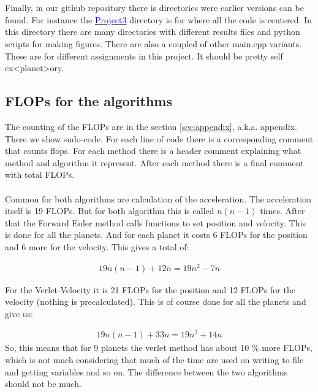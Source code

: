 \\
\\
Finally, in our github repository there is directories were earlier versions can be found. For instance the 
\href{https://github.com/erikfsk/Project-3/tree/master/Project3/}{\textcolor{blue}{Project3}} directory is for where all the code is centered. In this directory there are many directories with different results files and python scripts for making figures. There are also a coupled of other main.cpp variants. These are for different assignments in this project. It should be pretty self ex<planet>ory. 


\subsection{FLOPs for the algorithms}\label{sec:flops}

The counting of the FLOPs are in the section \ref{sec:appendix}, a.k.a. appendix. There we show sudo-code. For each line of code there is a corresponding comment that counts flops. For each method there is a header comment explaining what method and algorithm it represent. After each method there is a final comment with total FLOPs.
\\
\\
Common for both algorithms are calculation of the acceleration. The acceleration itself is 19 FLOPs. But for both algorithm this is called $n(n-1)$ times. After that the Forward Euler method calls functions to set position and velocity. This is done for all the planets. And for each planet it costs 6 FLOPs for the position and 6 more for the velocity. This gives a total of:

\begin{align*}
	19n(n-1) + 12n = 19n^2 - 7n
\end{align*}

For the Verlet-Velocity it is 21 FLOPs for the position and 12 FLOPs for the velocity (nothing is precalculated). This is of course done for all the planets and give us: 

\begin{align*}
	19n(n-1) + 33n = 19n^2 + 14n
\end{align*}
So, this means that for 9 planets the verlet method has about 10 \% more FLOPs, which is not much considering that much of the time are used on writing to file and getting variables and so on. The difference between the two algorithms should not be much.


























